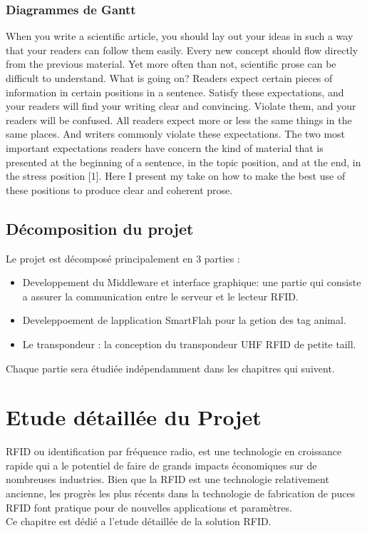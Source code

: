 \documentclass[11pt, a4paper, twoside]{book}
\begin{document}
\subsection{Diagrammes	de	Gantt}
When you write a scientific article, you should lay out your ideas in such a way that your readers can follow them easily. Every new concept should flow directly from the previous material. Yet more often than not, scientific prose can be difficult to understand. What is going on? Readers expect certain pieces of information in certain positions in a sentence. Satisfy these expectations, and your readers will find your writing clear and convincing. Violate them, and your readers will be confused. All readers expect more or less the same things in the same places. And writers commonly violate these expectations. The two most important expectations readers have concern the kind of material that is presented at the beginning of a sentence, in the topic position, and at the end, in the stress position [1]. Here I present my take on how to make the best use of these positions to produce clear and coherent prose.
\section{Décomposition du projet}
Le projet est décomposé principalement en 3 parties :
\begin{itemize}
\item Developpement du Middleware et interface graphique: une partie qui consiste a assurer la communication entre le serveur et le lecteur RFID.
\item Develeppoement de lapplication SmartFlah pour la getion des tag animal.
\item Le transpondeur : la conception du transpondeur UHF RFID de petite taill.\\
\end{itemize}

Chaque partie sera étudiée indépendamment dans les chapitres qui suivent.

\chapter{Etude	détaillée du Projet}
RFID ou identification par fréquence radio, est une technologie en croissance rapide qui a le potentiel de faire de grands impacts économiques sur de nombreuses industries. Bien que la RFID est une technologie relativement ancienne, les progrès les plus récents dans la technologie de fabrication de puces RFID font pratique pour de nouvelles applications et paramètres.\\
Ce chapitre est dédié a l'etude	détaillée de la solution RFID.
\end{document}
